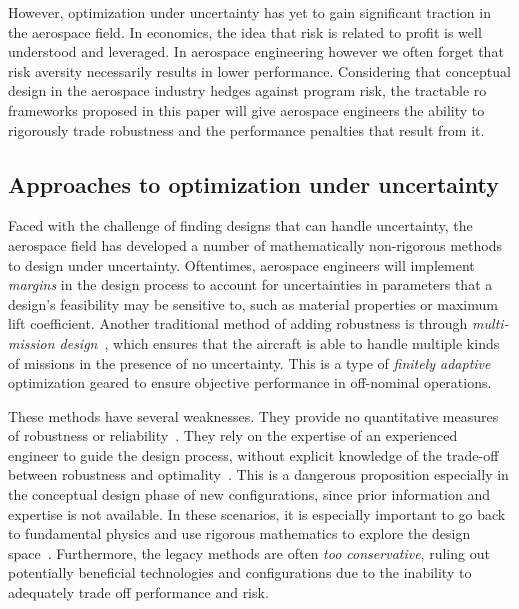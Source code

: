 However, optimization under uncertainty has yet to gain significant traction in the aerospace field.
In economics, the idea that risk is related to profit is well understood and leveraged.
In aerospace engineering however we often forget that risk aversity necessarily results in lower performance.
Considering that conceptual design in the aerospace industry hedges against program risk,
the tractable \gls{ro} frameworks proposed in this paper will
give aerospace engineers the ability to rigorously trade robustness and the performance penalties
that result from it.

\subsection{Approaches to optimization under uncertainty}
\label{sec:approaches}

Faced with the challenge of finding designs that can handle uncertainty,
the aerospace field has developed a number of mathematically non-rigorous methods to
design under uncertainty. Oftentimes, aerospace engineers will implement
\emph{margins} in the design process to account for uncertainties in parameters that a design's feasibility
may be sensitive to, such as material properties or maximum lift coefficient.
Another traditional method of adding robustness is through \emph{multi-mission design}~\cite{York2018},
which ensures that the aircraft is able to handle
multiple kinds of missions in the presence of no uncertainty. This is a type of \emph{finitely
adaptive} optimization geared to ensure objective performance in off-nominal operations.

These methods have several weaknesses. They provide no quantitative measures of
robustness or reliability~\cite{Zang2002}. They rely on the expertise of an experienced
engineer to guide the design process, without explicit knowledge of the trade-off between
robustness and optimality~\cite{Yao2011}. This is a dangerous proposition especially in the
conceptual design phase of new configurations, since prior information and expertise is not
available. In these scenarios, it is especially important to go back to fundamental physics
and use rigorous mathematics to explore the design space~\cite{York2018}. Furthermore,
the legacy methods are often \emph{too conservative}, ruling out potentially beneficial technologies
and configurations due to the inability to adequately trade off performance and risk.

